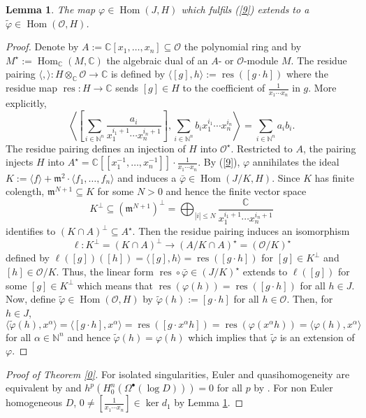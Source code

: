 \documentclass{amsart}
\theoremstyle{definition}
\theoremstyle{plain}
\newtheorem{lem}[ntn]{Lemma}
\theoremstyle{remark}
\newcommand{\m}{\mathfrak{m}}
\newcommand{\C}{\mathbb{C}}
\newcommand{\N}{\mathbb{N}}
\renewcommand{\O}{\mathcal{O}}
\DeclareMathOperator{\Hom}{Hom}
\DeclareMathOperator{\res}{res}
\begin{document}
\begin{lem}\label{10}
The map $\varphi\in\Hom(J,H)$ which fulfils (\ref{9}) extends to a $\tilde\varphi\in\Hom(\O,H)$.
\end{lem}

\begin{proof}
Denote by $A:=\C[x_1,\dots,x_n]\subseteq\O$ the polynomial ring and by $M^\star:=\Hom_\C(M,\C)$ the algebraic dual of an $A$- or $\O$-module $M$.
The residue pairing \cite[Sect.~B.1]{Ems78} $\langle,\rangle:H\otimes_\C\O\to\C$ is defined by $\langle[g],h\rangle:=\res([g\cdot h])$ where the residue map $\res:H\to\C$ sends $[g]\in H$ to the coefficient of $\frac{1}{x_1\cdots x_n}$ in $g$.
More explicitly,
\[
\left\langle\left[\sum_{i\in\N^n}\frac{a_i}{x_1^{i_1+1}\cdots x_n^{i_n+1}}\right],\sum _{i\in\N^n}b_ix_1^{i_1}\cdots x_n^{i_n}\right\rangle=\sum_{i\in\N^n}a_ib_i.
\]
The residue pairing defines an injection of $H$ into $\O^\star$.
Restricted to $A$, the pairing injects $H$ into $A^\star=\C[[x_1^{-1},\dots,x_n^{-1}]]\cdot\frac{1}{x_1\cdots x_n}$.
By (\ref{9}), $\varphi$ annihilates the ideal $K:=\langle f\rangle+\m^2\cdot\langle f_1,\dots,f_n\rangle$ and induces a $\bar\varphi\in\Hom(J/K,H)$.
Since $K$ has finite colength, $\m^{N+1}\subseteq K$ for some $N>0$ and hence the finite vector space
\[
K^\perp\subseteq(\m^{N+1})^\perp=\bigoplus_{|i|\le N}\frac{\C}{x_1^{i_1+1}\cdots x_n^{i_n+1}}
\]
identifies to $(K\cap A)^{\perp}\subseteq A^\star$.
Then the residue pairing induces an isomorphism
\[
\ell:K^{\perp}=(K\cap A)^{\perp}\to(A/K\cap A)^{\star}=(\O/K)^{\star}
\] 
defined by $\ell([g])([h])=\langle[g],h\rangle=\res([g\cdot h])$ for $[g]\in K^{\perp}$ and $[h]\in\O/K$.
Thus, the linear form $\res\circ\bar\varphi\in(J/K)^\star$ extends to $\ell([g])$ for some $[g]\in K^{\perp}$ which means that $\res(\varphi(h))=\res([g\cdot h])$ for all $h\in J$.
Now, define $\tilde\varphi\in\Hom(\O,H)$ by $\tilde\varphi(h):=[g\cdot h]$ for all $h\in\O$.
Then, for $h\in J$,
\[
\langle\tilde\varphi(h),x^\alpha\rangle=\langle[g\cdot h],x^\alpha\rangle=\res([g\cdot x^\alpha h])=\res(\varphi(x^\alpha h))=\langle\varphi(h),x^\alpha\rangle
\]
for all $\alpha\in\N^n$ and hence $\tilde\varphi(h)=\varphi(h)$ which implies that $\tilde\varphi$ is an extension of $\varphi$.
\end{proof}

\begin{proof}[Proof of Theorem \ref{0}]
For isolated singularities, Euler and quasihomogeneity are equivalent by \cite{Sai71} and $h^p(H^n_0(\Omega^\bullet(\log D)))=0$ for all $p$ by \cite[Cor.~1.8]{HM98}.
For non Euler homogeneous $D$, $0\ne[\frac{1}{x_1\cdots x_n}]\in\ker d_1$ by Lemma \ref{10}. 
\end{proof}



\end{document}
